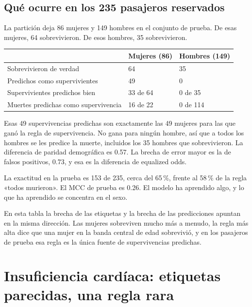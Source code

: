 \documentclass[11pt]{article}
\newcommand{\pct}[1]{\mbox{#1\,\%}}
\begin{document}
\subsection{Qué ocurre en los 235 pasajeros reservados}

La partición deja 86 mujeres y 149 hombres en el conjunto de prueba. De esas mujeres, 64 sobrevivieron. De esos hombres, 35 sobrevivieron.

\begin{table}[H]
\centering
\small
\begin{tabularx}{\textwidth}{@{}l Y Y@{}}
\toprule
 & Mujeres (86) & Hombres (149) \\
\midrule
Sobrevivieron de verdad & 64 & 35 \\
Predichos como supervivientes & 49 & 0 \\
Supervivientes predichos bien & 33 de 64 & 0 de 35 \\
Muertes predichas como supervivencia & 16 de 22 & 0 de 114 \\
\bottomrule
\end{tabularx}
\end{table}

Esas 49 supervivencias predichas son exactamente las 49 mujeres para las que ganó la regla de supervivencia. No gana para ningún hombre, así que a todos los hombres se les predice la muerte, incluidos los 35 hombres que sobrevivieron. La diferencia de paridad demográfica es 0.57. La brecha de error mayor es la de falsos positivos, 0.73, y esa es la diferencia de equalized odds.

La exactitud en la prueba es 153 de 235, cerca del \pct{65}, frente al \pct{58} de la regla «todos murieron». El MCC de prueba es 0.26. El modelo ha aprendido algo, y lo que ha aprendido se concentra en el sexo.

\begin{lesson}
En esta tabla la brecha de las etiquetas y la brecha de las predicciones apuntan en la misma dirección. Las mujeres sobreviven mucho más a menudo, la regla más alta dice que una mujer en la banda central de edad sobrevivió, y en los pasajeros de prueba esa regla es la única fuente de supervivencias predichas.
\end{lesson}

\section{Insuficiencia cardíaca: etiquetas parecidas, una regla rara}
\label{sec:heart}
\end{document}

